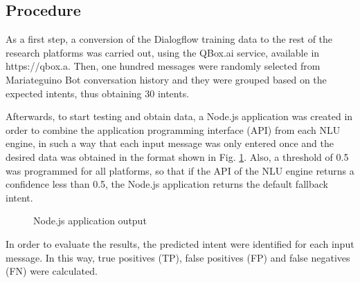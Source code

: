 \documentclass[conference, letterpaper]{IEEEtran}
\begin{document}
\subsection{Procedure}

As a first step, a conversion of the Dialogflow training data to the rest of the research platforms was carried out, using the QBox.ai service, available in https://qbox.a. Then, one hundred messages were randomly selected from Mariateguino Bot conversation history and they were grouped based on the expected intents, thus obtaining 30 intents.

Afterwards, to start testing and obtain data, a Node.js application was created in order to combine the application programming interface (API) from each NLU engine, in such a way that each input message was only entered once and the desired data was obtained in the format shown in Fig. \ref{fig:nludata}. Also, a threshold of 0.5 was programmed for all platforms, so that if the API of the NLU engine returns a confidence less than 0.5, the Node.js application returns the default fallback intent.

\begin{figure}[t]
  \centerline{}
  \caption{Node.js application output}
  \label{fig:nludata}
\end{figure}

In order to evaluate the results, the predicted intent were identified for each input message. In this way, true positives (TP), false positives (FP) and false negatives (FN) were calculated.
\end{document}
